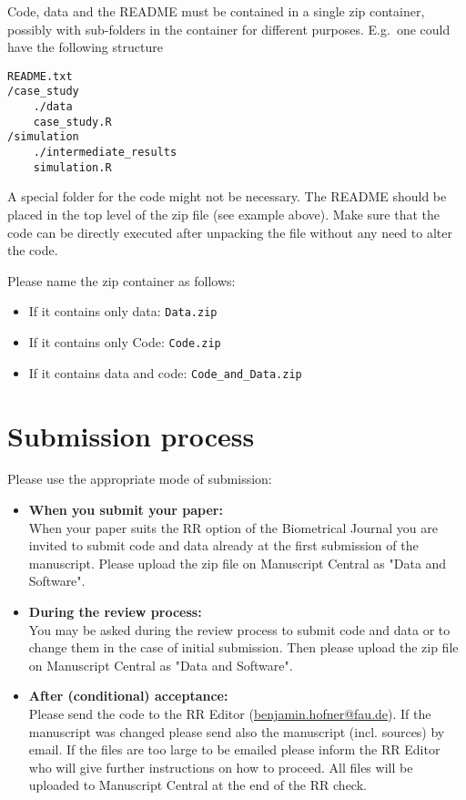 \documentclass[12pt,a4paper]{article}
\begin{document}
Code, data and the README {must} be contained in a single zip container,
possibly with sub-folders in the container for different purposes. E.g.\ one
could have the following structure

\begin{verbatim}
README.txt
/case_study
    ./data
    case_study.R
/simulation
    ./intermediate_results
    simulation.R
\end{verbatim}

A special folder for the code might not be necessary. The README should be
placed in the top level of the zip file (see example above). Make sure that the
code can be directly executed after unpacking the file without any need to alter
the code.

Please name the zip container as follows:
\begin{itemize}
\item If it contains only data: \texttt{Data.zip}
\item If it contains only Code: \texttt{Code.zip}
\item If it contains data and code: \texttt{Code\_and\_Data.zip}
\end{itemize}

\newpage

\section{Submission process}

Please use the appropriate mode of submission:

\begin{itemize}
\item \textbf{When you submit your paper:}\\[0.5em]
  When your paper suits the RR option of the Biometrical Journal you are
  invited to submit code and data already at the first submission of the
  manuscript. Please upload the zip file on Manuscript Central as "Data and
  Software".
\item \textbf{During the review process:}\\[0.5em]
  You may be asked during the review process to submit code and data or to
  change them in the case of initial submission. Then please upload the zip file
  on Manuscript Central as "Data and Software".
\item \textbf{After (conditional) acceptance:}\\[0.5em]
  Please send the code to the RR Editor
  (\href{mailto:benjamin.hofner@fau.de}{benjamin.hofner@fau.de}). If the
  manuscript was changed please send also the manuscript (incl. sources) by
  email. If the files are too large to be emailed please inform the RR Editor
  who will give further instructions on how to proceed. All files will be
  uploaded to Manuscript Central at the end of the RR check.
\end{itemize}
\end{document}
